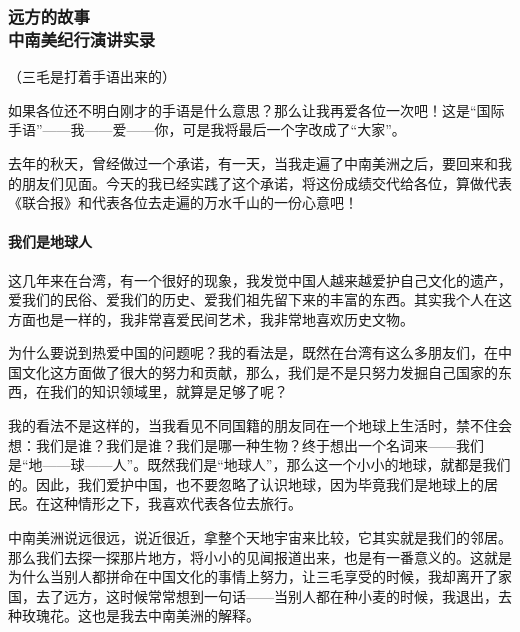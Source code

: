 \subsubsection{远方的故事\\\small{中南美纪行演讲实录}}


\par （三毛是打着手语出来的）
\par 如果各位还不明白刚才的手语是什么意思？那么让我再爱各位一次吧！这是“国际手语”——我——爱——你，可是我将最后一个字改成了“大家”。
\par 去年的秋天，曾经做过一个承诺，有一天，当我走遍了中南美洲之后，要回来和我的朋友们见面。今天的我已经实践了这个承诺，将这份成绩交代给各位，算做代表《联合报》和代表各位去走遍的万水千山的一份心意吧！
\paragraph*{我们是地球人}
\par 这几年来在台湾，有一个很好的现象，我发觉中国人越来越爱护自己文化的遗产，爱我们的民俗、爱我们的历史、爱我们祖先留下来的丰富的东西。其实我个人在这方面也是一样的，我非常喜爱民间艺术，我非常地喜欢历史文物。
\par 为什么要说到热爱中国的问题呢？我的看法是，既然在台湾有这么多朋友们，在中国文化这方面做了很大的努力和贡献，那么，我们是不是只努力发掘自己国家的东西，在我们的知识领域里，就算是足够了呢？
\par 我的看法不是这样的，当我看见不同国籍的朋友同在一个地球上生活时，禁不住会想：我们是谁？我们是谁？我们是哪一种生物？终于想出一个名词来——我们是“地——球——人”。既然我们是“地球人”，那么这一个小小的地球，就都是我们的。因此，我们爱护中国，也不要忽略了认识地球，因为毕竟我们是地球上的居民。在这种情形之下，我喜欢代表各位去旅行。
\par 中南美洲说远很远，说近很近，拿整个天地宇宙来比较，它其实就是我们的邻居。那么我们去探一探那片地方，将小小的见闻报道出来，也是有一番意义的。这就是为什么当别人都拼命在中国文化的事情上努力，让三毛享受的时候，我却离开了家国，去了远方，这时候常常想到一句话——当别人都在种小麦的时候，我退出，去种玫瑰花。这也是我去中南美洲的解释。

